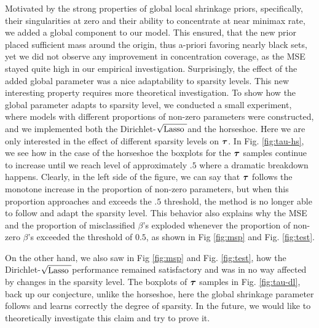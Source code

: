 \documentclass[10pt]{article}
\def\sqdl{Dirichlet-$\sqrt{\text{\rm{Lasso} }}$}
\begin{document}
Motivated by the strong properties of global local shrinkage priors, specifically, their singularities at zero and their ability to concentrate at near minimax rate, we added a global component to our model. This ensured, that the new prior placed sufficient mass around the origin, thus a-priori favoring nearly black sets, yet we did not observe any improvement in concentration coverage, as the MSE stayed quite high in our empirical investigation. Surprisingly, the effect of the added global parameter was a nice adaptability to sparsity levels. This new interesting property requires more theoretical investigation. 
To show how the global parameter adapts to sparsity level, we conducted a small experiment, where models with different proportions of non-zero parameters were constructed, and we implemented both the \sqdl and the horseshoe. Here we are only interested in the effect of different sparsity levels on $\boldsymbol{\tau}$. In Fig. \ref{fig:tau-hs}, we see how in the case of the horseshoe the boxplots for the $\boldsymbol{\tau}$ samples continue to increase until we reach  level of approximately $.5$ where a dramatic breakdown happens. Clearly, in the left side of the figure, we can say that $\boldsymbol{\tau}$ follows the monotone increase in the proportion of non-zero parameters, but when this proportion approaches and exceeds the $.5$ threshold, the method is no longer able to follow and adapt the sparsity level. This behavior also explains why the MSE and the proportion of misclassified $\beta$'s exploded whenever the proportion of non-zero $\beta$'s exceeded the threshold of $0.5$, as shown in Fig \ref{fig:msp} and Fig. \ref{fig:test}.


On the other hand, we also saw in Fig \ref{fig:msp} and Fig. \ref{fig:test}, how the \sqdl performance remained satisfactory and was in no way affected by changes in the sparsity level. The boxplots of $\boldsymbol{\tau}$ samples in Fig. \ref{fig:tau-dl}, back up our conjecture, unlike the horseshoe, here the global shrinkage parameter follows and learns correctly the degree of sparsity. In the future, we would like to theoretically investigate this claim and try to prove it.
\end{document}
